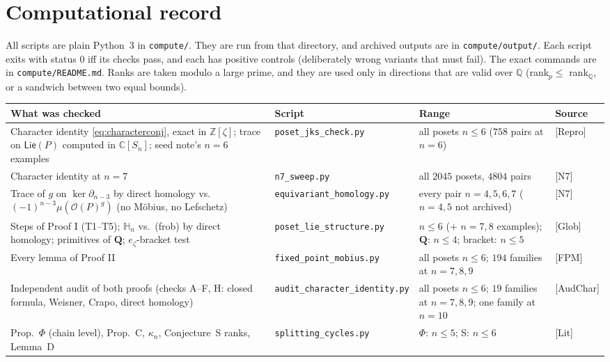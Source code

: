 \documentclass[11pt]{article}
\theoremstyle{definition}
\theoremstyle{remark}
\newcommand{\OP}{\mathcal O}
\newcommand{\HH}{\mathbb H}
\newcommand{\PLie}{\mathsf{Lie}}
\newcommand{\src}[1]{\nolinkurl{#1}}
\begin{document}
\section{Computational record}\label{sec:computations}

All scripts are plain Python~3 in \src{compute/}. They are run from that
directory, and archived outputs are in \src{compute/output/}. Each script
exits with status $0$ iff its checks pass, and each has positive controls
(deliberately wrong variants that must fail). The exact commands are in
\src{compute/README.md}. Ranks are taken modulo a large prime, and they are
used only in directions that are valid over $\mathbb Q$ (rank$_p\le$
rank$_{\mathbb Q}$, or a sandwich between two equal bounds).

{\small
\begin{longtable}{>{\raggedright}p{}>{\raggedright}p{}>{\raggedright}p{}p{}}
\textbf{What was checked} & \textbf{Script} & \textbf{Range} & \textbf{Source}\\\hline
\endhead
Character identity \eqref{eq:characterconj}, exact in $\mathbb Z[\zeta]$; trace on $\PLie(P)$ computed in $\mathbb C[S_n]$; seed note's $n=6$ examples &
\src{poset_jks_check.py} & all posets $n\le6$ ($758$ pairs at $n=6$) & [Repro]\\
Character identity at $n=7$ & \src{n7_sweep.py} & all $2045$ posets, $4804$ pairs & [N7]\\
Trace of $g$ on $\ker\partial_{n-3}$ by direct homology vs.\ $(-1)^{n-3}\mu(\OP(P)^g)$ (no M\"obius, no Lefschetz) &
\src{equivariant_homology.py} & every pair $n=4,5,6,7$ ($n=4,5$ not archived) & [N7]\\
Steps of Proof I (T1--T5); $\HH_n$ vs.\ (frob) by direct homology; primitives of $\mathbf Q$; $e_\zeta$-bracket test &
\src{poset_lie_structure.py} & $n\le6$ (+ $n=7,8$ examples); $\mathbf Q$: $n\le4$; bracket: $n\le5$ & [Glob]\\
Every lemma of Proof II &
\src{fixed_point_mobius.py} & all posets $n\le6$; $194$ families at $n=7,8,9$ & [FPM]\\
Independent audit of both proofs (checks A--F, H: closed formula, Weisner, Crapo, direct homology) &
\src{audit_character_identity.py} & all posets $n\le6$; $19$ families at $n=7,8,9$; one family at $n=10$ & [AudChar]\\
Prop.~$\Phi$ (chain level), Prop.~C, $\kappa_n$, Conjecture~S ranks, Lemma~D &
\src{splitting_cycles.py} & $\Phi$: $n\le5$; S: $n\le6$ & [Lit]\\

\end{longtable}}
\end{document}
